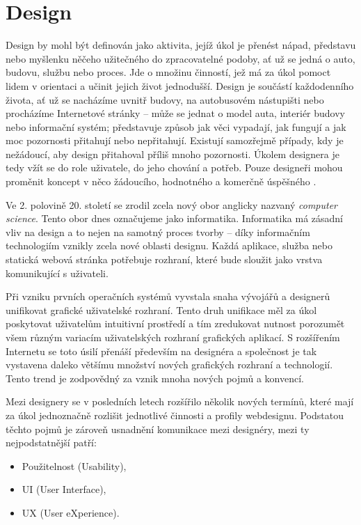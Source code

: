 \chapter{Design}
\label{chap:design}

Design by mohl být definován jako aktivita, jejíž úkol je přenést nápad, představu nebo myšlenku něčeho užitečného do zpracovatelné podoby, ať už se jedná o auto, budovu, službu nebo proces. Jde o množinu činností, jež má za úkol pomoct lidem v orientaci a učinit jejich život jednodušší. Design je součástí každodenního života, ať už se nacházíme uvnitř budovy, na autobusovém nástupišti nebo procházíme Internetové stránky -- může se jednat o model auta, interiér budovy nebo informační systém; představuje způsob jak věci vypadají, jak fungují a jak moc pozornosti přitahují nebo nepřitahují. Existují samozřejmě případy, kdy je nežádoucí, aby design přitahoval příliš mnoho pozornosti. Úkolem designera je tedy vžít se do role uživatele, do jeho chování a potřeb. Pouze designeři mohou proměnit koncept v něco žádoucího, hodnotného a komerčně úspěšného \cite{8}.

Ve 2. polovině 20. století se zrodil zcela nový obor anglicky nazvaný \textit{computer science}. Tento obor dnes označujeme jako informatika. Informatika má zásadní vliv na design a to nejen na samotný proces tvorby -- díky informačním technologiím vznikly zcela nové oblasti designu. Každá aplikace, služba nebo statická webová stránka potřebuje rozhraní, které bude sloužit jako vrstva komunikující s uživateli.

Při vzniku prvních operačních systémů vyvstala snaha vývojářů a designerů unifikovat grafické uživatelské rozhraní. Tento druh unifikace měl za úkol poskytovat uživatelům intuitivní prostředí a tím zredukovat nutnost porozumět všem různým variacím uživatelských rozhraní grafických aplikací. S rozšířením Internetu se toto úsilí přenáší především na designéra a společnost je tak vystavena daleko většímu množství nových grafických rozhraní a technologií. Tento trend je zodpovědný za vznik mnoha nových pojmů a konvencí.

Mezi designery se v posledních letech rozšířilo několik nových termínů, které mají za úkol jednoznačně rozlišit jednotlivé činnosti a profily webdesignu. Podstatou těchto pojmů je zároveň usnadnění komunikace mezi designéry, mezi ty nejpodstatnější patří:

\begin{itemize}
    \item Použitelnost (Usability),
    \item UI (User Interface),
    \item UX (User eXperience).
\end{itemize}

